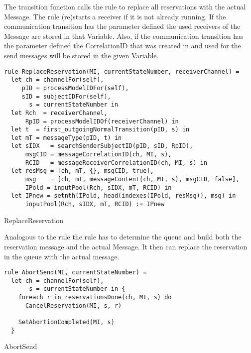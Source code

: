 The transition function calls the  rule to replace all reservations with the actual Message. The  rule (re)starts a receiver if it is not already running. If the communication transition has the parameter  defined the used receivers of the Message are stored in that Variable. Also, if the communication transition has the parameter  defined the CorrelationID that was created in  and used for the send messages will be stored in the given Variable.


\begin{listing}[htbp]
\begin{verbatim}
rule ReplaceReservation(MI, currentStateNumber, receiverChannel) =
  let ch = channelFor(self),
     pID = processModelIDFor(self),
     sID = subjectIDFor(self),
       s = currentStateNumber in
  let Rch  = receiverChannel,
      RpID = processModelIDOf(receiverChannel) in
  let t  = first_outgoingNormalTransition(pID, s) in
  let mT = messageType(pID, t) in
  let sIDX   = searchSenderSubjectID(pID, sID, RpID),
      msgCID = messageCorrelationID(ch, MI, s),
      RCID   = messageReceiverCorrelationID(ch, MI, s) in
  let resMsg = [ch, mT, {}, msgCID, true],
      msg    = [ch, mT, messageContent(ch, MI, s), msgCID, false],
      IPold = inputPool(Rch, sIDX, mT, RCID) in
  let IPnew = setnth(IPold, head(indexes(IPold, resMsg)), msg) in
      inputPool(Rch, sIDX, mT, RCID) := IPnew
\end{verbatim}
\caption{ReplaceReservation}
\label{lst:shortasm:ReplaceReservation}
\end{listing}


Analogous to the  rule the  rule has to determine the queue and build both the reservation message and the actual Message. It then can replace the reservation in the queue with the actual message.


\begin{listing}[htbp]
\begin{verbatim}
rule AbortSend(MI, currentStateNumber) =
  let ch = channelFor(self),
       s = currentStateNumber in {
    foreach r in reservationsDone(ch, MI, s) do
      CancelReservation(MI, s, r)

    SetAbortionCompleted(MI, s)
  }
\end{verbatim}
\caption{AbortSend}
\label{lst:shortasm:AbortSend}
\end{listing}


